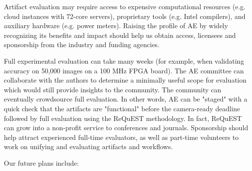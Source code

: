 \documentclass[10pt,onecolumn]{article}
\newenvironment{packed_itemize}{
\begin{itemize}
  \setlength{\itemsep}{1pt}
  \setlength{\parskip}{0pt}
  \setlength{\parsep}{0pt}
}{\end{itemize}}
\begin{document}
\begin{packed_itemize}
 \item

Artifact evaluation may require access to expensive
computational resources (e.g. cloud instances with 72-core
servers), proprietary tools (e.g. Intel compilers), and
auxiliary hardware (e.g. power meters). Raising the profile
of AE by widely recognizing its benefits and impact should
help us obtain access, licensees and sponsorship from the
industry and funding agencies.

 \item

Full experimental evaluation can take many weeks (for example,
when validating accuracy on 50,000 images on a 100 MHz FPGA
board). The AE committee can collaborate with the authors
to determine a minimally useful scope for evaluation which
would still provide insights to the community. The community
can eventually crowdsource full evaluation. In other words,
AE can be "staged" with a quick check that the artifacts are
"functional" before the camera-ready deadline followed by full
evaluation using the ReQuEST methodology. In fact, ReQuEST can
grow into a non-profit service to conferences and journals.
Sponsorship should help attract experienced full-time
evaluators, as well as part-time volunteers to work
on unifying and evaluating artifacts and workflows.

\end{packed_itemize}



Our future plans include:
\end{document}
